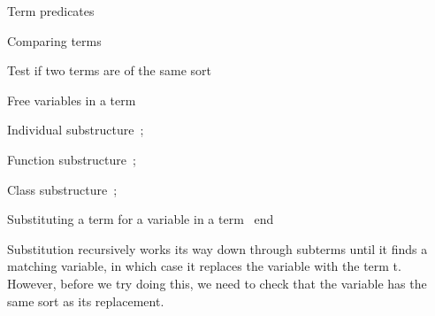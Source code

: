 \LA{}Term predicates~{\nwtagstyle{}}\RA{}

\LA{}Comparing terms~{\nwtagstyle{}}\RA{}

\LA{}Test if two terms are of the same sort~{\nwtagstyle{}}\RA{}

\LA{}Free variables in a term~{\nwtagstyle{}}\RA{}

\LA{}Individual substructure~{\nwtagstyle{}}\RA{};

\LA{}Function substructure~{\nwtagstyle{}}\RA{};

\LA{}Class substructure~{\nwtagstyle{}}\RA{};

\LA{}Substituting a term for a variable in a term~{\nwtagstyle{}}\RA{}
end
\eatline
{}\nwendcode{}\nwdocspar
\begin{node}
Substitution recursively works its way down through subterms until it
finds a matching variable, in which case it replaces the variable with
the term {\Tt{}t\nwendquote}. However, before we try doing this, we need to check
that the variable has the same sort as its replacement.
\end{node}

